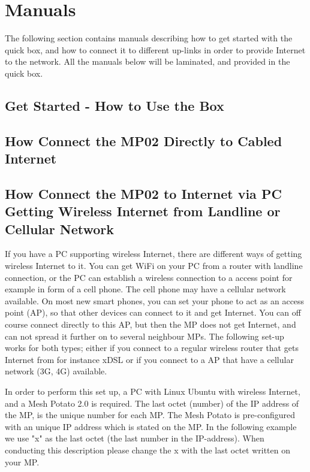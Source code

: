\section{Manuals}
The following section contains manuals describing how to get started with the \gls{quick} box, and how to connect it to different up-links in order to provide Internet to the network. All the manuals below will be laminated, and provided in the \gls{quick} box. 

\subsection{Get Started - How to Use the Box}


\subsection{How Connect the MP02 Directly to Cabled Internet}
\label{subsec:cabledInternet}


\subsection{How Connect the MP02 to Internet via PC Getting Wireless Internet from Landline or Cellular Network}
\label{subsec:internetviaPC}

If you have a PC supporting wireless Internet, there are different ways of getting wireless Internet to it. You can get WiFi on your PC from a router with landline connection, or the PC can establish a wireless connection to a access point for example in form of a cell phone. The cell phone may have a cellular network available. On most new smart phones, you can set your phone to act as an access point (AP), so that other devices can connect to it and get Internet. You can off course connect directly to this AP, but then the MP does not get Internet, and can not spread it further on to several neighbour MPs. The following set-up works for both types; either if you connect to a regular wireless router that gets Internet from for instance xDSL or if you connect to a AP that have a cellular network (3G, 4G) available. 

In order to perform this set up, a PC with Linux Ubuntu with wireless Internet, and a Mesh Potato 2.0 is required. The last octet (number) of the IP address of the MP, is the unique number for each MP. The Mesh Potato is pre-configured with an unique IP address which is stated on the MP. In the following example we use "x" as the last octet (the last number in the IP-address). When conducting this description please change the x with the last octet written on your MP.

